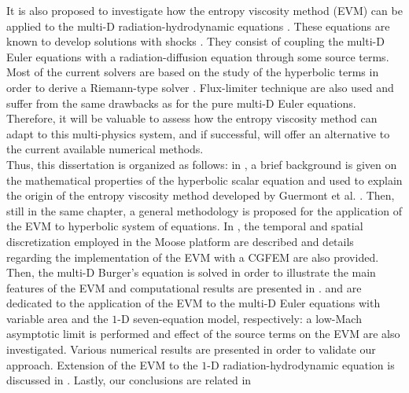 It is also proposed to investigate how the entropy viscosity method (EVM) can be applied to the multi-D radiation-hydrodynamic equations \cite{LowrieMorelHittinger}. These equations are known to develop solutions with shocks \cite{Balsara}. They consist of coupling the multi-D Euler equations with a radiation-diffusion equation through some source terms.  Most of the current solvers are based on the study of the hyperbolic terms in order to derive a Riemann-type solver \cite{LowrieMorel}. Flux-limiter technique \cite{EdwardsMorelLowrie} are also used and suffer from the same drawbacks as for the pure multi-D Euler equations. Therefore, it will be valuable to assess how the entropy viscosity method can adapt to this multi-physics system, and if successful, will offer an alternative to the current available numerical methods.\\

Thus, this dissertation is organized as follows: in , a brief background is given on the mathematical properties of the hyperbolic scalar equation and used to explain the origin of the entropy viscosity method developed by Guermont et al. \cite{jlg1}. Then, still in the same chapter, a general methodology is proposed for the application of the EVM to hyperbolic system of equations. In , the temporal and spatial discretization employed in the Moose platform \cite{Moose} are described and details regarding the implementation of the EVM with a CGFEM are also provided. Then, the multi-D Burger's equation is solved in order to illustrate the main features of the EVM and computational results are presented in .  and  are dedicated to the application of the EVM to the multi-D Euler equations with variable area and the $1$-D seven-equation model, respectively: a low-Mach asymptotic limit is performed and effect of the source terms on the EVM are also investigated. Various numerical results are presented in order to validate our approach. Extension of the EVM to the $1$-D radiation-hydrodynamic equation is discussed in . Lastly, our conclusions are related in 
%

